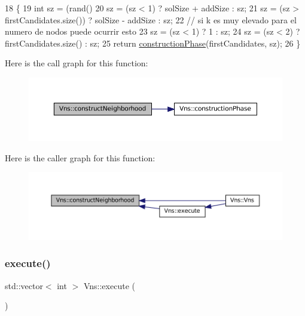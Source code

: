 \begin{DoxyCode}
18 \{
19   \textcolor{keywordtype}{int} sz = (rand() %
20   sz = (sz < 1) ? solSize + addSize : sz;
21   sz = (sz > firstCandidates.size()) ? solSize - addSize : sz;
22   \textcolor{comment}{// si k es muy elevado para el numero de nodos puede ocurrir esto}
23   sz = (sz < 1) ? 1 : sz;
24   sz = (sz < 2) ? firstCandidates.size() : sz;
25   \textcolor{keywordflow}{return} \hyperlink{classVns_aefd9719db68183a6b2ec871c86226ee4}{constructionPhase}(firstCandidates, sz);
26 \}
\end{DoxyCode}
Here is the call graph for this function\+:
\nopagebreak
\begin{figure}[H]
\begin{center}
\leavevmode
\includegraphics[width=350pt]{classVns_a8eee9f0e31bb41bcd7bd00c46170e5b9_cgraph}
\end{center}
\end{figure}
Here is the caller graph for this function\+:
\nopagebreak
\begin{figure}[H]
\begin{center}
\leavevmode
\includegraphics[width=350pt]{classVns_a8eee9f0e31bb41bcd7bd00c46170e5b9_icgraph}
\end{center}
\end{figure}
\mbox{\label{classVns_aece2ea2cb74dd3608570321fcbb2de0c}} 
\subsubsection{\texorpdfstring{execute()}{execute()}}
{\footnotesize\ttfamily std\+::vector$<$ int $>$ Vns\+::execute (\begin{DoxyParamCaption}{ }\end{DoxyParamCaption})\hspace{0.3cm}{\ttfamily [virtual]}}



